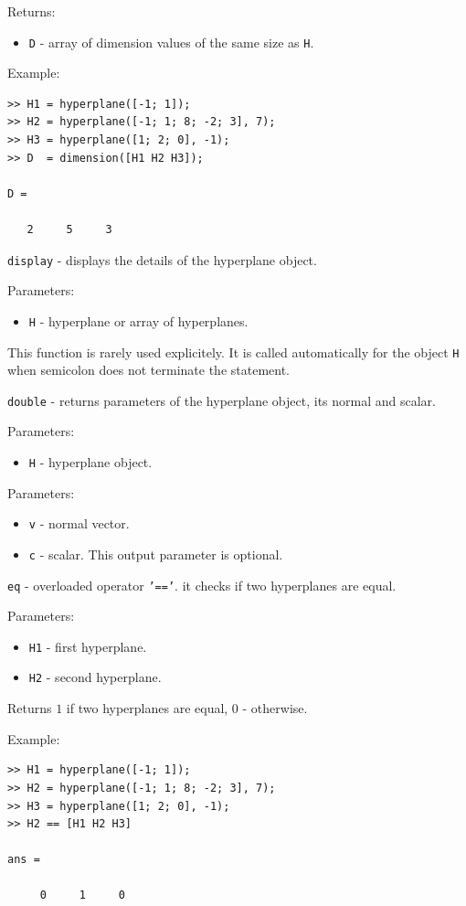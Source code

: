 \documentclass{report}
\begin{document}
Returns:
\begin{itemize}
\item {\tt D} - array of dimension values of the same size as {\tt H}.
\end{itemize}

Example:
{\tt \begin{verbatim}
>> H1 = hyperplane([-1; 1]);
>> H2 = hyperplane([-1; 1; 8; -2; 3], 7);
>> H3 = hyperplane([1; 2; 0], -1);
>> D  = dimension([H1 H2 H3]);

D =

   2     5     3
\end{verbatim} }

\newpage

{\Large {\tt display}} - displays the details of the hyperplane object.

Parameters:
\begin{itemize}
\item {\tt H} - hyperplane or array of hyperplanes.
\end{itemize}
This function is rarely used explicitely. It is called automatically
for the object {\tt H} when semicolon does not terminate the statement.

\newpage

{\Large {\tt double}} - returns parameters of the hyperplane object,
its normal and scalar.

Parameters:
\begin{itemize}
\item {\tt H} - hyperplane object.
\end{itemize}

Parameters:
\begin{itemize}
\item {\tt v} - normal vector.
\item {\tt c} - scalar. This output parameter is optional.
\end{itemize}

\newpage

{\Large {\tt eq}} - overloaded operator {\tt '=='}.
it checks if two hyperplanes are equal.

Parameters:
\begin{itemize}
\item {\tt H1} - first hyperplane.
\item {\tt H2} - second hyperplane.
\end{itemize}

Returns $1$ if two hyperplanes are equal, $0$ - otherwise.

Example:
{\tt \begin{verbatim}
>> H1 = hyperplane([-1; 1]);
>> H2 = hyperplane([-1; 1; 8; -2; 3], 7);
>> H3 = hyperplane([1; 2; 0], -1);
>> H2 == [H1 H2 H3]

ans =

     0     1     0
\end{verbatim} }
\end{document}
